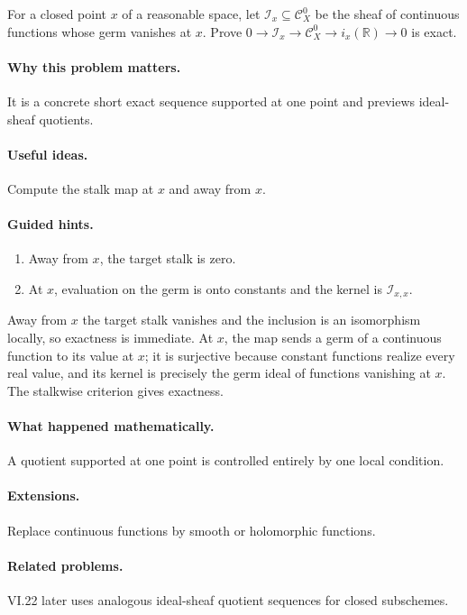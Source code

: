 \begin{problem}\label{prob:vi16-p17}
For a closed point $x$ of a reasonable space, let $\mathcal I_x\subseteq\mathcal C^0_X$ be the sheaf of continuous functions whose germ vanishes at $x$.  Prove $0\to\mathcal I_x\to\mathcal C^0_X\to i_x(\mathbb R)\to0$ is exact.
\end{problem}

\ifdefined\FullProblemDossiers
\paragraph{Why this problem matters.}
It is a concrete short exact sequence supported at one point and previews ideal-sheaf quotients.

\paragraph{Useful ideas.}
Compute the stalk map at $x$ and away from $x$.

\paragraph{Guided hints.}
\begin{enumerate}
\item Away from $x$, the target stalk is zero.
\item At $x$, evaluation on the germ is onto constants and the kernel is $\mathcal I_{x,x}$.
\end{enumerate}

\begin{solution}
Away from $x$ the target stalk vanishes and the inclusion is an isomorphism locally, so exactness is immediate.  At $x$, the map sends a germ of a continuous function to its value at $x$; it is surjective because constant functions realize every real value, and its kernel is precisely the germ ideal of functions vanishing at $x$.  The stalkwise criterion gives exactness.
\end{solution}

\paragraph{What happened mathematically.}
A quotient supported at one point is controlled entirely by one local condition.

\paragraph{Extensions.}
Replace continuous functions by smooth or holomorphic functions.

\paragraph{Related problems.}
VI.22 later uses analogous ideal-sheaf quotient sequences for closed subschemes.
\fi
